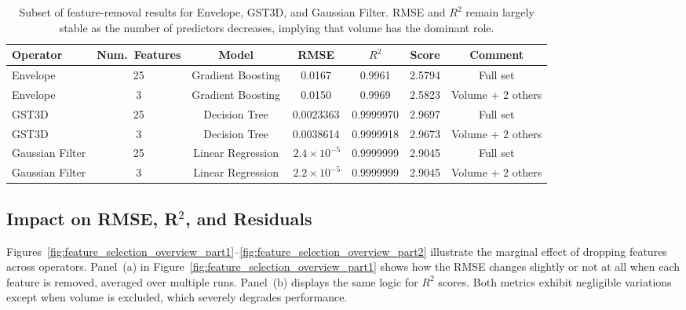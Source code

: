 \begin{table}[htbp]
    \centering
    \begin{tabular}{lcccccc}
        \hline
        \textbf{Operator} & \textbf{Num.\ Features} & \textbf{Model}    & \textbf{\ac{RMSE}}       & \textbf{$R^2$} & \textbf{Score} & \textbf{Comment} \\
        \hline
        Envelope          & 25                      & Gradient Boosting & 0.0167                   & 0.9961         & 2.5794         & Full set          \\
        Envelope          & 3                       & Gradient Boosting & 0.0150                   & 0.9969         & 2.5823         & Volume + 2 others \\
        \hline
        \ac{GST3D}        & 25                      & Decision Tree     & 0.0023363                & 0.9999970      & 2.9697         & Full set          \\
        \ac{GST3D}        & 3                       & Decision Tree     & 0.0038614                & 0.9999918      & 2.9673         & Volume + 2 others \\
        \hline
        Gaussian Filter   & 25                      & Linear Regression & \(\,2.4 \times 10^{-5}\) & 0.9999999      & 2.9045         & Full set          \\
        Gaussian Filter   & 3                       & Linear Regression & \(\,2.2 \times 10^{-5}\) & 0.9999999      & 2.9045         & Volume + 2 others \\
        \hline
    \end{tabular}
    \caption{Subset of feature-removal results for Envelope, \ac{GST3D}, and Gaussian Filter.
        \ac{RMSE} and $R^2$ remain largely stable as the number of predictors decreases, implying that volume has the dominant role.
        \label{tab:feature_selection_minimal_impact}
    }
\end{table}

\subsection{Impact on RMSE, R\texorpdfstring{$^2$}{2}, and Residuals}
\label{subsec:impact-on-rmse-r2-and-residuals}

Figures~\ref{fig:feature_selection_overview_part1}--\ref{fig:feature_selection_overview_part2} illustrate the marginal effect of dropping features across operators.
Panel~(a) in Figure~\ref{fig:feature_selection_overview_part1} shows how the \ac{RMSE} changes slightly or not at all when each feature is removed, averaged over multiple runs.
Panel~(b) displays the same logic for $R^2$ scores.
Both metrics exhibit negligible variations except when volume is excluded, which severely degrades performance.

